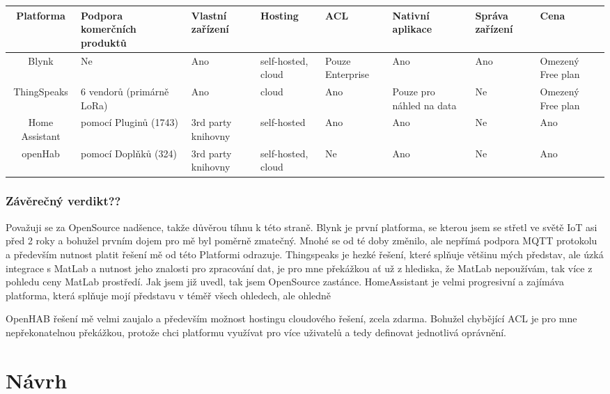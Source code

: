 \documentclass[thesis=B,czech]{FITthesis}[2019/12/23]
\begin{document}
\begin{center} %
    \begin{tabular}{ |c| m{5em}| m{5em}|m{5em}|m{4em}| m{5em}| m{4em}| m{4em}| } 
     \hline 
     Platforma & Podpora komerčních produktů & Vlastní zařízení & Hosting & ACL & Nativní aplikace & Správa zařízení & Cena \\
     \hline
     Blynk & Ne & Ano & self-hosted, cloud & Pouze Enterprise & Ano & Ano &  Omezený Free plan\\
     \hline
     ThingSpeaks & 6 vendorů (primárně LoRa) & Ano & cloud & Ano & Pouze pro náhled na data & Ne & Omezený Free plan\\
     \hline
Home Assistant & pomocí Pluginů (1743) & 3rd party knihovny & self-hosted & Ano & Ano & Ne & Ano\\
\hline
openHab & pomocí Doplňků (324) & 3rd party knihovny & self-hosted, cloud & Ne & Ano & Ne & Ano\\
     \hline
    \end{tabular}
    \end{center} 

\subsection{Závěrečný verdikt??}
Považuji se za OpenSource nadšence, takže důvěrou tíhnu k této straně. Blynk je první platforma, se kterou jsem se střetl ve světě IoT asi před 2 roky a bohužel prvním dojem pro mě byl poměrně zmatečný. Mnohé se od té doby změnilo, ale nepřímá podpora MQTT protokolu a především nutnost platit řešení mě od této Platformi odrazuje. Thingspeaks je hezké řešení, které splňuje většinu mých představ, ale úzká integrace s MatLab a nutnost jeho znalosti pro zpracování dat, je pro mne překážkou ať už z hlediska, že MatLab nepoužívám, tak více z pohledu ceny MatLab prostředí. Jak jsem již uvedl, tak jsem OpenSource zastánce. HomeAssistant je velmi progresivní a zajímáva platforma, která splňuje mojí představu v téměř všech ohledech, ale ohledně %

OpenHAB řešení mě velmi zaujalo a především možnost hostingu cloudového řešení, zcela zdarma. Bohužel chybějící ACL je pro mne nepřekonatelnou překážkou, protože chci platformu využívat pro více uživatelů a tedy definovat jednotlivá oprávnění.

\chapter{Návrh}
\end{document}
